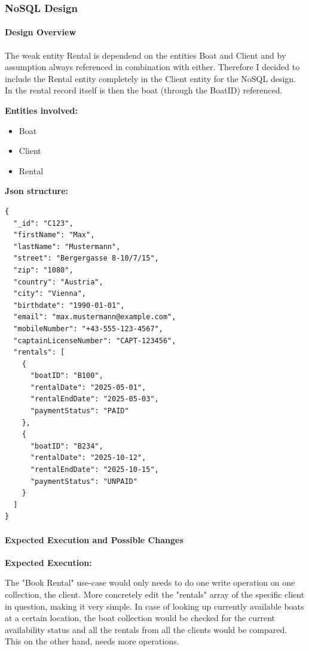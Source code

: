 \documentclass[a4paper, 11pt]{article}          %
\begin{document}
\subsubsection{NoSQL Design}
\paragraph*{Design Overview}
\noindent
The weak entity Rental is dependend on the entities Boat and Client and by assumption always referenced in combination with either. Therefore I decided to include the Rental entity completely in the Client entity for the NoSQL design. In the rental record itself is then the boat (through the BoatID) referenced.

\noindent
\textbf{Entities involved:}
\begin{itemize}
    \item Boat
    \item Client
    \item Rental
\end{itemize}

\noindent
\textbf{Json structure:}
\begin{lstlisting}
{
  "_id": "C123",
  "firstName": "Max",
  "lastName": "Mustermann",
  "street": "Bergergasse 8-10/7/15",
  "zip": "1080",
  "country": "Austria",
  "city": "Vienna",
  "birthdate": "1990-01-01",
  "email": "max.mustermann@example.com",
  "mobileNumber": "+43-555-123-4567",
  "captainLicenseNumber": "CAPT-123456",
  "rentals": [
    {
      "boatID": "B100",
      "rentalDate": "2025-05-01",
      "rentalEndDate": "2025-05-03",
      "paymentStatus": "PAID"
    },
    {
      "boatID": "B234",
      "rentalDate": "2025-10-12",
      "rentalEndDate": "2025-10-15",
      "paymentStatus": "UNPAID"
    }
  ]
}

\end{lstlisting}

\paragraph*{Expected Execution and Possible Changes}
\noindent
\textbf{Expected Execution:}

\noindent
The "Book Rental" use-case would only needs to do one write operation on one collection, the client. More concretely edit the "rentals" array of the specific client in question, making it very simple. In case of looking up currently available boats at a certain location, the boat collection would be checked for the current availability status and all the rentals from all the clients would be compared. This on the other hand, needs more operations.\\
\end{document}
